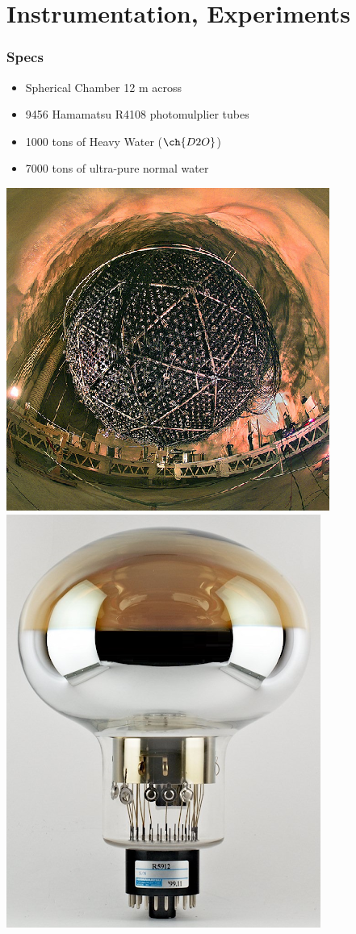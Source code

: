 \documentclass[10pt]{beamer}
\begin{document}
	\section{Instrumentation, Experiments}

	\begin{frame}
		\frametitle{Specs}

		\begin{itemize}
			\item Spherical Chamber 12 m across
			\item 9456 Hamamatsu R4108 photomulplier tubes
			\item 1000 tons of Heavy Water ($\ch{D2O}$)
			\item 7000 tons of ultra-pure normal water
		\end{itemize}


		\begin{center}
			\includegraphics[scale=1]{outer_photo.jpeg} \phantom{aaaaaaa}
			\includegraphics[scale=0.2]{photomultiplier.png}
		\end{center}


\end{frame}
\end{document}
